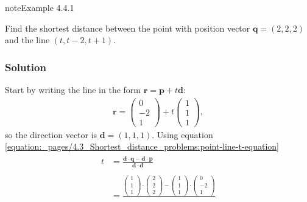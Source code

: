 \documentclass[letterpaper,10pt,english]{jupyterBook}
\begin{document}
\label{_pages/4.3_Shortest_distance_problems:point-line-distance-example}
\begin{sphinxadmonition}{note}{Example 4.4.1}



\sphinxAtStartPar
Find the shortest distance between the point with position vector \(\mathbf{q} = (2,2,2)\) and the line \((t,t-2, t+1)\).
\subsubsection*{Solution}

\sphinxAtStartPar
Start by writing the line in the form \(\mathbf{r} = \mathbf{p} + t \mathbf{d}\):
\begin{equation*}
\begin{split} \mathbf{r} = \begin{pmatrix} 0 \\ -2 \\ 1 \end{pmatrix} + t
\begin{pmatrix} 1 \\ 1 \\ 1 \end{pmatrix}, \end{split}
\end{equation*}
\sphinxAtStartPar
so the direction vector is \(\mathbf{d} = (1, 1, 1)\). Using equation \eqref{equation:_pages/4.3_Shortest_distance_problems:point-line-t-equation}
\begin{equation*}
\begin{split} \begin{align*}
    t &= \frac{\mathbf{d} \cdot \mathbf{q} - \mathbf{d} \cdot \mathbf{p}}{\mathbf{d} \cdot \mathbf{d}} \\ \\
    &= \frac{
        \begin{pmatrix} 1 \\ 1 \\ 1 \end{pmatrix} \cdot
        \begin{pmatrix} 2 \\ 2 \\ 2 \end{pmatrix} -
        \begin{pmatrix} 1 \\ 1 \\ 1 \end{pmatrix} \cdot
        \begin{pmatrix} 0 \\ -2 \\ 1 \end{pmatrix}}{
}
\end{align*}
\end{split}
\end{equation*}
\end{sphinxadmonition}
\end{document}
